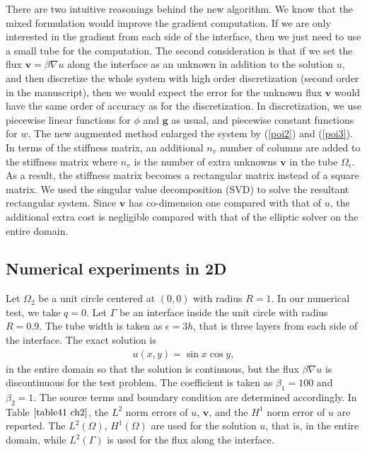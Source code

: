 \documentclass[11pt]{article}
\numberwithin{equation}{section}
\begin{document}
 There are two intuitive reasonings behind the new algorithm.
 We know that the mixed formulation would improve the gradient computation.
 If we are only interested in the gradient from each side of the interface,
 then we just need to use a small tube for the computation.
 The second consideration is that if we set the flux
 $\mathbf{v}=\beta \nabla u$ along the interface
 as an unknown in addition to the solution $u$,
 and then discretize the whole system with high order discretization (second order in the manuscript),
 then we would expect the error for the unknown flux $\mathbf{v}$ would have the same order of accuracy as for the discretization.
In discretization, we use piecewise linear functions for $\phi$ and $\mathbf{g}$ as usual,
and piecewise constant functions for $w$.
The new augmented method enlarged the system by (\ref{poi2}) and (\ref{poi3}).
In terms of the stiffness matrix,
an additional $n_v$ number of columns are added to the stiffness matrix
where $n_v$ is the number of extra unknowns  $\mathbf{v}$ in the tube $\Omega_{\epsilon}$.
As a result, the stiffness matrix becomes a rectangular matrix instead of a square matrix.
We used the singular value decomposition (SVD) to solve the resultant rectangular system.
Since $\mathbf{v}$ has co-dimension one compared with that of $u$,
the additional extra cost is negligible compared with that of the elliptic solver on the entire domain.


\subsection{Numerical experiments in 2D}

Let $\Omega_2$ be a unit circle centered at $(0,0)$ with radius $R=1$.
In our numerical test, we take $q=0$.
Let $\Gamma$ be an interface inside the unit circle with radius $R=0.9$.
The tube width is taken as $\epsilon=3h$, that is three layers from each side of the interface.
The  exact solution is
\begin{eqnarray}
 u(x,y)  = \sin x \cos y,
\end{eqnarray}
in the entire domain so that the solution is continuous,
but the flux $\beta \nabla u$ is discontinuous for the test problem.
The coefficient is taken as $\beta_1=100$ and $\beta_2=1$.
The source terms and boundary condition are determined accordingly.
In Table $\ref{table41 ch2}$,
the $L^2$ norm errors of $u$, $\mathbf{v}$,
and the $H^1$ norm error of $u$ are reported.
The $L^2(\Omega)$, $H^1(\Omega)$ are used for the solution $u$,
that is, in the entire domain, while $L^2(\Gamma)$ is used for the flux along the interface.
\end{document}
